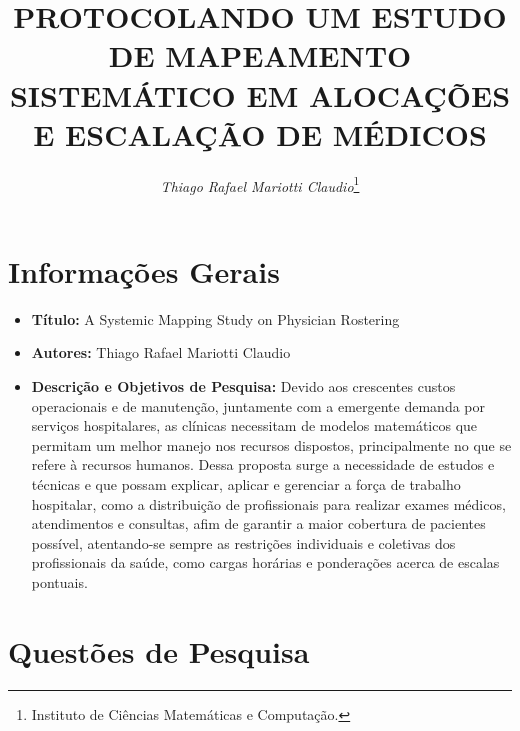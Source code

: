 \documentclass[article,12pt,oneside]{article}
\title{\Large{\uppercase{PROTOCOLANDO UM ESTUDO DE MAPEAMENTO SISTEMÁTICO EM ALOCAÇÕES E ESCALAÇÃO DE MÉDICOS}}}
\author{\large\emph{Thiago Rafael Mariotti Claudio}\thanks{Instituto de Ciências Matemáticas e Computação.}}
\date{}
\begin{document}

\maketitle
\thispagestyle{empty}


\tableofcontents
\vspace{14pt}
\clearpage


\section*{Informações Gerais}

	\begin{itemize}
		\item \textbf{Título:} A Systemic Mapping Study on Physician Rostering
		\item \textbf{Autores:} Thiago Rafael Mariotti Claudio
		\item \textbf{Descrição e Objetivos de Pesquisa:} Devido aos crescentes custos operacionais e de manutenção, juntamente com a emergente demanda por serviços hospitalares, as clínicas necessitam de modelos matemáticos que permitam um melhor manejo nos recursos dispostos, principalmente no que se refere à recursos humanos. Dessa proposta surge a necessidade de estudos e técnicas e que possam explicar, aplicar e gerenciar a força de trabalho hospitalar, como a distribuição de profissionais para realizar exames médicos, atendimentos e consultas, afim de garantir a maior cobertura de pacientes possível, atentando-se sempre as restrições individuais e coletivas dos profissionais da saúde, como cargas horárias e ponderações acerca de escalas pontuais.
		
	\end{itemize}

\section*{Questões de Pesquisa}
\end{document}
